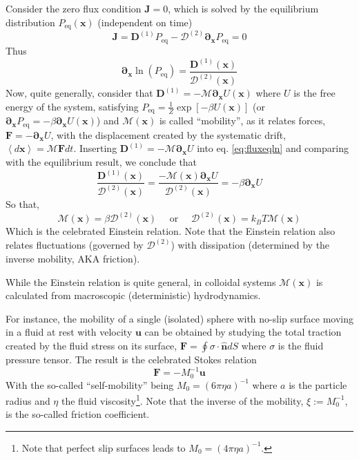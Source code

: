 \documentclass[ twoside,openright,titlepage,numbers=noenddot,%
headinclude,footinclude,cleardoublepage=empty,abstract=on,
BCOR=5mm,paper=a4,fontsize=11pt, dvipsnames
]{scrreprt}
\renewcommand{\vec}[1]{\bm{#1}}
\newcommand{\tens}[1]{\bm{\mathcal{#1}}}
\newcommand{\kT}{k_B T}
\newcommand{\pvel}{u}
\begin{document}
Consider the zero flux condition $\vec{J}=0$, which is solved by the equilibrium distribution $P_{\text{eq}}(\vec{x})$ (independent on time)
\begin{equation}
  \label{eq:fluxeq}
  \vec{J} = \vec{D}^{(1)}P_{\text{eq}} - \tens{D}^{(2)}\vec{\partial}_{\vec{x}}P_{\text{eq}} = 0
\end{equation}
Thus
\begin{equation}
  \label{eq:fluxeqln}
\vec{\partial}_{\vec{x}}\ln \left(P_{\text{eq}}\right) = \frac{\vec{D}^{(1)}(\vec{x})}{\tens{D}^{(2)}(\vec{x})}
\end{equation}
Now, quite generally, consider that $\vec{D}^{(1)} = -\tens{M}\vec{\partial}_{\vec{x}}U(\vec{x})$ where $U$ is the free energy of the system, satisfying $P_{\text{eq}} = \frac{1}{Z}\exp\left[-\beta U(\vec{x})\right]$ (or $\vec{\partial}_{\vec{x}}P_{\text{eq}} = -\beta \vec{\partial}_{\vec{x}} U(\vec{x})$) and $\tens{M}(\vec{x})$ is called ``mobility'', as it relates forces, $\vec{F} = -\vec{\partial}_{\vec{x}}U$, with the displacement created by the systematic drift, $\left\langle d\vec{x}\right\rangle = \tens{M}\vec{F} dt$. Inserting $\vec{D}^{(1)} = -\tens{M}\vec{\partial}_{\vec{x}}U$ into eq. \eqref{eq:fluxeqln} and comparing with the equilibrium result, we conclude that
\begin{equation}
  \frac{\vec{D}^{(1)}(\vec{x})}{\tens{D}^{(2)}(\vec{x})} = \frac{-\tens{M}(\vec{x})\vec{\partial}_{\vec{x}}U}{\tens{D}^{(2)}(\vec{x})} = -\beta\vec{\partial}_{\vec{x}}U
\end{equation}
So that,
\begin{equation}
  \label{eq:einsteinrel}
  \tens{M}(\vec{x}) = \beta\tens{D}^{(2)}(\vec{x})\quad\text{ or }\quad\tens{D}^{(2)}(\vec{x}) = \kT\tens{M}(\vec{x})
\end{equation}
Which is the celebrated Einstein relation. Note that the Einstein relation also relates fluctuations (governed by $\tens{D}^{(2)}$) with dissipation (determined by the inverse mobility, AKA friction).

While the Einstein relation is quite general, in colloidal systems $\tens{M}(\vec{x})$ is calculated from macroscopic (deterministic) hydrodynamics. 

For instance, the mobility of a single (isolated) sphere with no-slip surface moving in a fluid at rest with velocity $\vec{\pvel}$ can be obtained\cite{Dhont1996} by studying the total traction created by the fluid stress on its surface, $\vec{F} = \oint\tens{\sigma}\cdot \hat{\vec{n}}dS$ where $\tens{\sigma}$ is the fluid pressure tensor. The result is the celebrated Stokes relation
\begin{equation}
  \label{eq:stokesrel}
  \vec{F} = -M_0^{-1} \vec{\pvel}
\end{equation}
With the so-called ``self-mobility'' being $M_0 = \left(6\pi\eta a\right)^{-1}$ where $a$ is the particle radius and $\eta$ the fluid viscosity\footnote{Note that perfect slip surfaces leads to $M_0 = (4\pi\eta a)^{-1}$.}. Note that the inverse of the mobility, $\xi := M_0^{-1}$, is the so-called friction coefficient.
\end{document}
